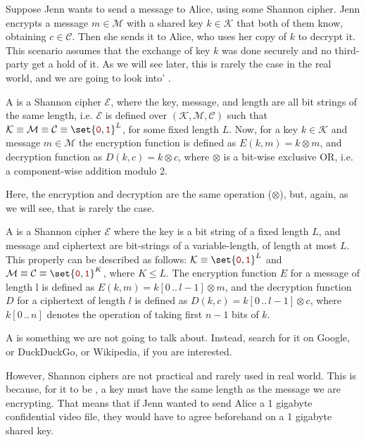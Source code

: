\documentclass[a4paper,10pt]{article}
\newcommand{\cll}[1]{\mathcal{#1}}
\newcommand{\xor}{\otimes}
\newcommand{\arri}[2]{[#1\,..\,#2]}
\newcommand{\mtt}[1]{{\color{darkred} \mathtt{#1}}}
\begin{document}
Suppose Jenn wants to send a message to Alice, using some Shannon cipher. Jenn
encrypts a message $m \in \cll{M}$ with a shared key $k \in \cll{K}$ that both
of them know, obtaining $c \in \cll{C}$. Then she sends it to Alice, who uses
her copy of $k$ to decrypt it. This scenario assumes that the exchange of key
$k$ was done securely and no third-party get a hold of it. As we will see later,
this is rarely the case in the real world, and we are going to look into'
.

\begin{example}
  A  is a Shannon cipher $\cll{E}$, where the key, message,
  and length are all bit strings of the same length, i.e. $\cll{E}$ is defined
  over $\cll{(K,M,C)}$ such that $\cll{K} \equiv \cll{M} \equiv \cll{C} \equiv \set{\mtt{0}, \mtt{1}}^L$,
  for some fixed length $L$. Now, for a key $k \in \cll{K}$ and message
  $m \in \cll{M}$ the encryption function is defined as $E(k,m) = k \xor m$,
  and decryption function as $D(k,c) = k \xor c$, where $\xor$ is a bit-wise
  exclusive OR, i.e. a component-wise addition modulo 2.

  Here, the encryption and decryption are the same operation ($\xor$), but, again,
  as we will see, that is rarely the case.
\end{example}

\begin{example}
  A  is a Shannon cipher $\cll{E}$ where the
  key is a bit string of a fixed length  $L$, and message and ciphertext are
  bit-strings of a variable-length, of length at most $L$. This properly can
  be described as follows: $\cll{K} \equiv \set{\mtt{0}, \mtt{1}}^L$ and $\cll{M} \equiv \cll{C} \equiv \set{\mtt{0}, \mtt{1}}^K$,
  where $K \leq L$. The encryption function $E$ for a message of length l is
  defined as $E(k,m) = k\arri{0}{l-1} \xor m$, and the decryption function $D$ for
  a ciphertext of length $l$ is defined as $D(k,c) = k\arri{0}{l-1} \xor c$, where
  $k\arri{0}{n}$ denotes the operation of taking first $n-1$ bits of $k$.
\end{example}

\begin{example}
  A  is something we are not going to talk about. Instead,
  search for it on Google, or DuckDuckGo, or Wikipedia, if you are interested.
\end{example}

However, Shannon ciphers are not practical and rarely used in real world. This
is because, for it to be , a key must have the same length
as the message we are encrypting. That means that if Jenn wanted to send Alice a
1 gigabyte confidential video file, they would have to agree beforehand on a 1
gigabyte shared key.
\end{document}
